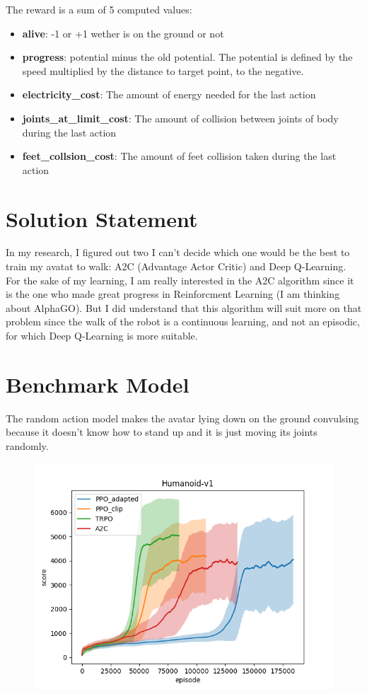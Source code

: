 \documentclass{article}
\begin{document}
The reward is a sum of 5 computed values: \begin{itemize}
  \item{\textbf{alive}: -1 or +1 wether is on the ground or not}
  \item{\textbf{progress}: potential minus the old potential. The potential is defined by
    the speed multiplied by the distance to target point, to the negative.}
  \item{\textbf{electricity\_cost}: The amount of energy needed for the last action}
  \item{\textbf{joints\_at\_limit\_cost}: The amount of collision between joints of body
      during the last action}
  \item{\textbf{feet\_collsion\_cost}: The amount of feet collision taken during the last action}
  \end{itemize}
	
	\section{Solution Statement}

  In my research, I figured out two I can't decide which one would be the best
  to train my avatat to walk: A2C (Advantage Actor Critic) and Deep Q-Learning.
  For the sake of my learning, I am really interested in the A2C algorithm since
  it is the one who made great progress in Reinforcment Learning (I am thinking
  about AlphaGO\cite{silver2017mastering}). But I did understand that this
  algorithm will suit more on that problem since the walk of the robot is a
  continuous learning, and not an episodic, for which Deep Q-Learning is more
  suitable.
  
	\section{Benchmark Model}

  The random action model makes the avatar lying down on the ground convulsing
  because it doesn't know how to stand up and it is just moving its joints
  randomly.

  \begin{figure}[ht]
    \centering
    \includegraphics[width=.5\textwidth,height=.5\textheight,keepaspectratio]{Humanoid}
  \end{figure}
\end{document}
